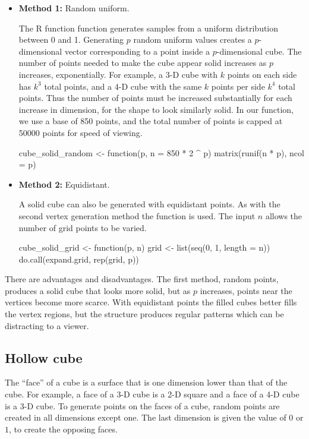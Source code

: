\begin{itemize}

  \item {\bf Method 1:} Random uniform.

    The R function  function generates samples from a
    uniform distribution between 0 and 1. Generating $p$ random
    uniform values creates a $p$-dimensional vector corresponding to a
    point inside a $p$-dimensional cube. The number of points needed
    to make the cube appear solid increases as $p$ increases, exponentially.  For example, a 3-D
    cube with $k$ points on each side has  $k^3$ total points, and a 4-D cube
    with the same $k$ points per side $k^4$ total points. Thus the number
    of points must be increased substantially for each increase in
    dimension, for the shape to look similarly solid. In our function, we use a base of 850 points, and the total
    number of points is capped at 50000 points for speed of viewing.

\begin{example}
cube_solid_random <- function(p, n = 850 * 2 ^ p) {
  matrix(runif(n * p), ncol = p)
}
\end{example}

  \item {\bf Method 2:} Equidistant.

    A solid cube can also be generated with equidistant points. As
    with the second vertex generation method the 
    function is used. The input $n$ allows the number of grid points
    to be varied.

\begin{example}
cube_solid_grid <- function(p, n) {
  grid <- list(seq(0, 1, length = n))
  do.call(expand.grid, rep(grid, p))
}
\end{example}
\end{itemize}

There are advantages and disadvantages.  The first method, random
points, produces a solid cube that looks more solid, but as $p$
increases, points near the vertices become more scarce.  With
equidistant points the filled cubes better fills the vertex regions, but the structure  produces regular patterns which can be distracting to a viewer.

\subsection{Hollow cube}

The ``face'' of a cube is a surface that is one dimension lower than
that of the cube.  For example, a face of a 3-D cube is a 2-D square
and a face of a 4-D cube is a 3-D cube. To generate points on the
faces of a cube, random points are created in all dimensions except
one. The last dimension is given the value of $0$ or $1$, to create
the opposing faces.

